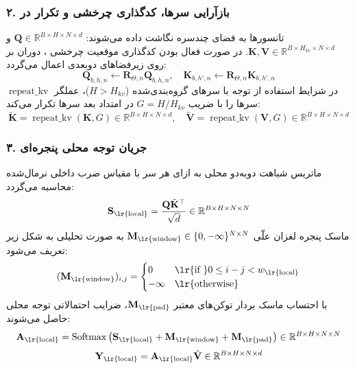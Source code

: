 \subsubsection*{۲. بازآرایی سرها، کدگذاری چرخشی  و تکرار در }
تانسورها به فضای چندسره نگاشت داده می‌شوند: $\mathbf{Q} \in \mathbb{R}^{B \times H \times N \times d}$ و $\mathbf{K}, \mathbf{V} \in \mathbb{R}^{B \times H_{kv} \times N \times d}$. در صورت فعال بودن کدگذاری موقعیت چرخشی ، دوران بر روی زیرفضاهای دوبعدی اعمال می‌گردد:
\begin{equation}
\mathbf{Q}_{b, h, n} \leftarrow \mathbf{R}_{\Theta, n} \mathbf{Q}_{b, h, n}, \quad \mathbf{K}_{b, h', n} \leftarrow \mathbf{R}_{\Theta, n} \mathbf{K}_{b, h', n}
\end{equation}
در شرایط استفاده از توجه با سرهای گروه‌بندی‌شده ($H > H_{kv}$)، عملگر $\operatorname{repeat\_kv}$ سرها را با ضریب $G = H / H_{kv}$ در امتداد بعد سرها تکرار می‌کند:
\begin{equation}
\tilde{\mathbf{K}} = \operatorname{repeat\_kv}(\mathbf{K}, G) \in \mathbb{R}^{B \times H \times N \times d}, \quad
\tilde{\mathbf{V}} = \operatorname{repeat\_kv}(\mathbf{V}, G) \in \mathbb{R}^{B \times H \times N \times d}
\end{equation}

\subsubsection*{۳. جریان توجه محلی پنجره‌ای }
ماتریس شباهت دو‌به‌دو محلی به ازای هر سر با مقیاس ضرب داخلی نرمال‌شده محاسبه می‌گردد:
\begin{equation}
\mathbf{S}_{\text{\lr{local}}} = \frac{\mathbf{Q} \tilde{\mathbf{K}}^\top}{\sqrt{d}} \in \mathbb{R}^{B \times H \times N \times N}
\end{equation}
ماسک پنجره لغزان علّی $\mathbf{M}_{\text{\lr{window}}} \in \{0, -\infty\}^{N \times N}$ به صورت تحلیلی به شکل زیر تعریف می‌شود:
\begin{equation}
(\mathbf{M}_{\text{\lr{window}}})_{i, j} = 
\begin{cases} 
0 & \text{\lr{if }} 0 \le i - j < w_{\text{\lr{local}}} \\ 
-\infty & \text{\lr{otherwise}} 
\end{cases}
\end{equation}
با احتساب ماسک بردار توکن‌های معتبر $\mathbf{M}_{\text{\lr{pad}}}$، ضرایب احتمالاتی توجه محلی حاصل می‌شوند:
\begin{equation}
\mathbf{A}_{\text{\lr{local}}} = \operatorname{Softmax}\left( \mathbf{S}_{\text{\lr{local}}} + \mathbf{M}_{\text{\lr{window}}} + \mathbf{M}_{\text{\lr{pad}}} \right) \in \mathbb{R}^{B \times H \times N \times N}
\end{equation}
\begin{equation}
\mathbf{Y}_{\text{\lr{local}}} = \mathbf{A}_{\text{\lr{local}}} \tilde{\mathbf{V}} \in \mathbb{R}^{B \times H \times N \times d}
\end{equation}

